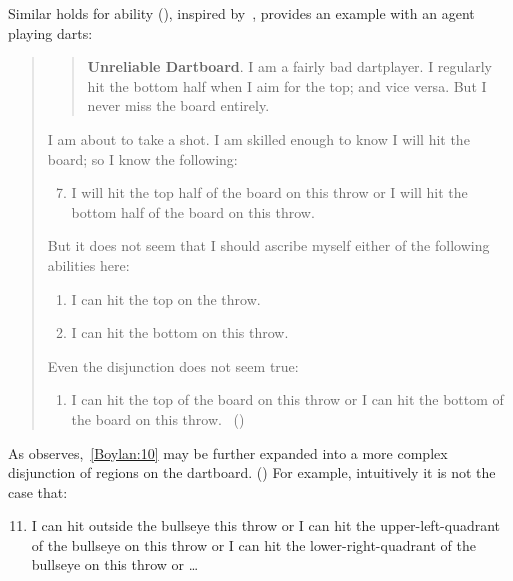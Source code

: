 \begin{note}
  Similar holds for ability \citeauthor{Boylan:2020aa} (\citeyear{Boylan:2020aa}), inspired by~\textcite{Kenny:1976vh}, provides an example with an agent playing darts:
  \begin{quote}
    \begin{quote}
      \textbf{Unreliable Dartboard}.
      I am a fairly bad dartplayer.
      I regularly hit the bottom half when I aim for the top; and vice versa.
      But I never miss the board entirely.
    \end{quote}

    I am about to take a shot.
    I am skilled enough to know I will hit the board; so I know the following:

    \begin{enumerate}[label=(\arabic*)]
      \setcounter{enumi}{6}
    \item
      I will hit the top half of the board on this throw or I will hit the bottom half of the board on this throw.
    \end{enumerate}

    But it does not seem that I should ascribe myself either of the following abilities here:

    \begin{enumerate}[label=(\arabic*), ref=(\arabic*), resume]
    \item
      I can hit the top on the throw.
    \item
      I can hit the bottom on this throw.
    \end{enumerate}

    Even the disjunction does not seem true:

    \begin{enumerate}[label=(\arabic*), ref=(\arabic*), resume]
    \item
      \label{Boylan:10}
      I can hit the top of the board on this throw or I can hit the bottom of the board on this throw.%
      \mbox{ }\hfill\mbox{(\citeyear[3]{Boylan:2020aa})}
    \end{enumerate}
  \end{quote}

  As \citeauthor{Boylan:2020aa} observes,~\ref{Boylan:10} may be further expanded into a more complex disjunction of regions on the dartboard.
  (\citeyear[4]{Boylan:2020aa})
  For example, intuitively it is not the case that:
  \begin{enumerate}[label=(\arabic*'), resume]
    \setcounter{enumi}{10}
  \item
    I can hit outside the bullseye this throw or I can hit the upper-left-quadrant of the bullseye on this throw or I can hit the lower-right-quadrant of the bullseye on this throw or \dots
  \end{enumerate}
\end{note}


